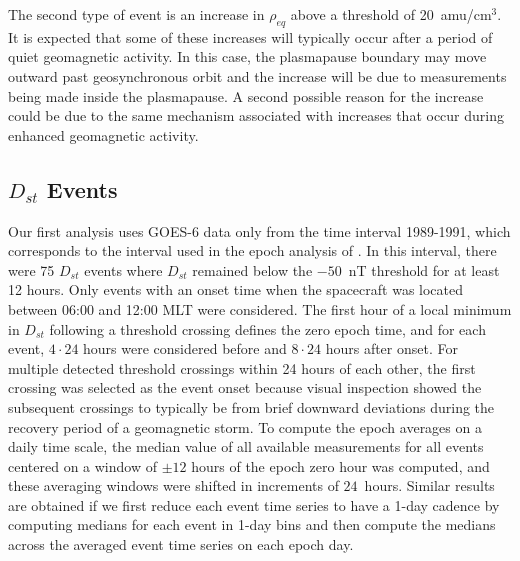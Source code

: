 \documentclass[draft,linenumbers]{agujournal}
\begin{document}
The second type of event is an increase in $\rho_{eq}$ above a threshold of 20~amu/cm$^3$.  It is expected that some of these increases will typically occur after a period of quiet geomagnetic activity.  In this case, the plasmapause boundary may move outward past geosynchronous orbit and the increase will be due to measurements being made inside the plasmapause.  A second possible reason for the increase could be due to the same mechanism associated with increases that occur during enhanced geomagnetic activity.

\subsection{$D_{st}$ Events}

Our first analysis uses GOES-6 data only from the time interval 1989-1991, which corresponds to the interval used in the epoch analysis of \citet{Takahashi2010}. In this interval, there were 75 $D_{st}$ events where $D_{st}$ remained below the $-50$~nT threshold for at least 12 hours. Only events with an onset time when the spacecraft was located between 06:00 and 12:00 MLT were considered. The first hour of a local minimum in $D_{st}$ following a threshold crossing defines the zero epoch time, and for each event, $4\cdot24$ hours were considered before and $8\cdot24$ hours after onset. For multiple detected threshold crossings within 24 hours of each other, the first crossing was selected as the event onset because visual inspection showed the subsequent crossings to typically be from brief downward deviations during the recovery period of a geomagnetic storm. To compute the epoch averages on a daily time scale, the median value of all available measurements for all events centered on a window of $\pm 12$ hours of the epoch zero hour was computed, and these averaging windows were shifted in increments of $24$~hours. Similar results are obtained if we first reduce each event time series to have a 1-day cadence by computing medians for each event in 1-day bins and then compute the medians across the averaged event time series on each epoch day. 
\end{document}
